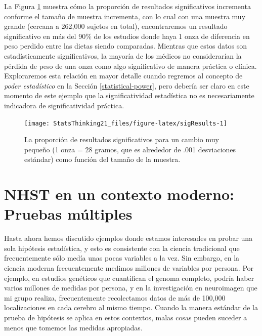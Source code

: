 \documentclass[
  12pt,
]{book}
\begin{document}
La Figura \ref{fig:sigResults} muestra cómo la proporción de resultados significativos incrementa conforme el tamaño de muestra incrementa, con lo cual con una muestra muy grande (cercana a 262,000 sujetos en total), encontraremos un resultado significativo en más del 90\% de los estudios donde haya 1 onza de diferencia en peso perdido entre las dietas siendo comparadas. Mientras que estos datos son estadísticamente significativos, la mayoría de los médicos no considerarían la pérdida de peso de una onza como algo significativo de manera práctica o clínica. Exploraremos esta relación en mayor detalle cuando regremos al concepto de \emph{poder estadístico} en la Sección \ref{statistical-power}, pero debería ser claro en este momento de este ejemplo que la significatividad estadística no es necesariamente indicadora de significatividad práctica.

\begin{figure}
\texttt{[image: StatsThinking21\_files/figure-latex/sigResults-1]} \caption{La proporción de resultados significativos para un cambio muy pequeño (1 onza = 28 gramos, que es alrededor de .001 desviaciones estándar) como función del tamaño de la muestra.}\label{fig:sigResults}
\end{figure}

\hypertarget{nhst-en-un-contexto-moderno-pruebas-muxfaltiples}{%
\section{NHST en un contexto moderno: Pruebas múltiples}\label{nhst-en-un-contexto-moderno-pruebas-muxfaltiples}}

Hasta ahora hemos discutido ejemplos donde estamos interesades en probar una sola hipótesis estadística, y esto es consistente con la ciencia tradicional que frecuentemente sólo medía unas pocas variables a la vez. Sin embargo, en la ciencia moderna frecuentemente medimos millones de variables por persona. Por ejemplo, en estudios genéticos que cuantifican el genoma completo, podría haber varios millones de medidas por persona, y en la investigación en neuroimagen que mi grupo realiza, frecuentemente recolectamos datos de más de 100,000 localizaciones en cada cerebro al mismo tiempo. Cuando la manera estándar de la prueba de hipótesis se aplica en estos contextos, malas cosas pueden suceder a menos que tomemos las medidas apropiadas.
\end{document}
